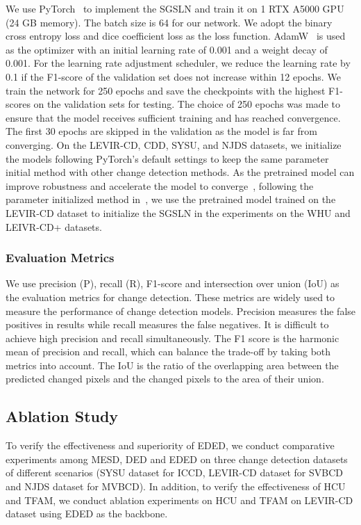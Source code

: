 \documentclass[journal]{IEEEtran}
\begin{document}
We use PyTorch~\cite{pytorch} to implement the SGSLN and train it on 1 RTX A5000 GPU (24 GB memory). The batch size is 64 for our network. We adopt the binary cross entropy loss and dice coefficient loss as the loss function. AdamW~\cite{adam} is used as the optimizer with an initial learning rate of 0.001 and a weight decay of 0.001. For the learning rate adjustment scheduler, we reduce the learning rate by 0.1 if the F1-score of the validation set does not increase within 12 epochs. We train the network for 250 epochs and save the checkpoints with the highest F1-scores on the validation sets for testing. The choice of 250 epochs was made to ensure that the model receives sufficient training and has reached convergence. The first 30 epochs are skipped in the validation as the model is far from converging. On the LEVIR-CD, CDD, SYSU, and NJDS datasets, we initialize the models following PyTorch's default settings to keep the same parameter initial method with other change detection methods. As the pretrained model can improve robustness and accelerate the model to converge~\cite{upt}, following the parameter initialized method in~\cite{fccdn}, we use the pretrained model trained on the LEVIR-CD dataset to initialize the SGSLN in the experiments on the WHU and LEIVR-CD+ datasets.

\subsubsection{Evaluation Metrics}

We use precision (P), recall (R), F1-score and intersection over union (IoU) as the evaluation metrics for change detection. These metrics are widely used to measure the performance of change detection models. Precision measures the false positives in results while recall measures the false negatives. It is difficult
to achieve high precision and recall simultaneously. The F1 score is the harmonic mean of precision and recall, which can balance the trade-off by taking both metrics into account. The IoU is the ratio of the overlapping area between the predicted changed pixels and the changed pixels to the area of their union.


\subsection{Ablation Study}
\label{section:4.4.1}

To verify the effectiveness and superiority of EDED, we conduct comparative experiments among MESD, DED and EDED on three change detection datasets of different scenarios (SYSU dataset for ICCD, LEVIR-CD dataset for SVBCD and NJDS dataset for MVBCD). In addition, to verify the effectiveness of HCU and TFAM, we conduct ablation experiments on HCU and TFAM on LEVIR-CD dataset using EDED as the backbone.
\end{document}
